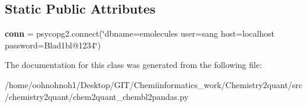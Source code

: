 \subsection*{Static Public Attributes}
\begin{DoxyCompactItemize}
\item 
\mbox{\label{classchemistry2quant_1_1chem2quant__chembl2pandas_1_1chemblConnect_aa102734757bfb1cee082f73e815ae6bd}} 
{\bfseries conn} = psycopg2.\+connect(\char`\"{}dbname=\textquotesingle{}emolecules\textquotesingle{} user=\textquotesingle{}sang\textquotesingle{} host=\textquotesingle{}localhost\textquotesingle{} password=\textquotesingle{}Blad1bl@1234\textquotesingle{}\char`\"{})
\end{DoxyCompactItemize}


The documentation for this class was generated from the following file\+:\begin{DoxyCompactItemize}
\item 
/home/oohnohnoh1/\+Desktop/\+G\+I\+T/\+Chemiinformatics\+\_\+work/\+Chemistry2quant/src/chemistry2quant/chem2quant\+\_\+chembl2pandas.\+py\end{DoxyCompactItemize}
